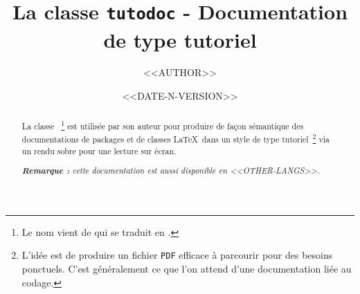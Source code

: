 \documentclass[10pt, a4paper]{../main/main}
\begin{document}
\title{La classe \texttt{tutodoc} - Documentation de type tutoriel}
\author{<<AUTHOR>>}
\date{<<DATE-N-VERSION>>}

\maketitle


\begin{abstract}
    La classe \thisproj{}\,%
    \footnote{
        Le nom vient de  qui se traduit en .
    }
    est utilisée par son auteur pour produire de façon sémantique des documentations de packages et de classes \LaTeX\ dans un style de type tutoriel\,%
    \footnote{
        L'idée est de produire un fichier \texttt{PDF} efficace à parcourir pour des besoins ponctuels. C'est généralement ce que l'on attend d'une documentation liée au codage.
    }
    via un rendu sobre pour une lecture sur écran.

    \smallskip

	\noindent
    \emph{\textbf{Remarque :} cette documentation est aussi disponible en <<OTHER-LANGS>>.}
\end{abstract}
\end{document}
